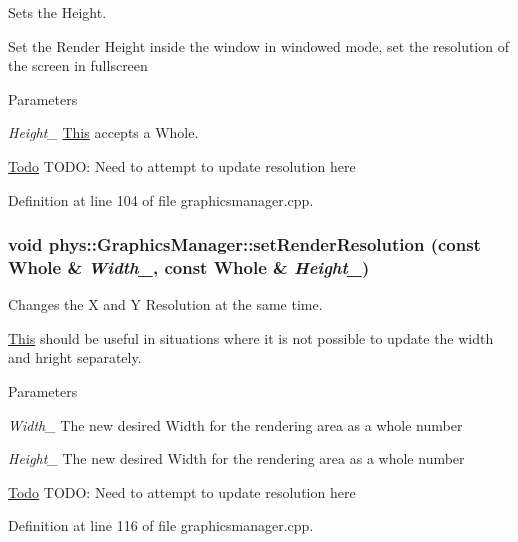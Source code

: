 Sets the Height. 

Set the Render Height inside the window in windowed mode, set the resolution of the screen in fullscreen 
\begin{DoxyParams}{Parameters}
\item[{\em Height\_\-}]\hyperlink{structThis}{This} accepts a Whole. \end{DoxyParams}


\begin{Desc}
\item[\hyperlink{todo__todo000011}{Todo}]TODO: Need to attempt to update resolution here \end{Desc}




Definition at line 104 of file graphicsmanager.cpp.

\hypertarget{classphys_1_1GraphicsManager_ac6feb044d9ab394f3e65d51026a899a6}{
\subsubsection[{setRenderResolution}]{\setlength{\rightskip}{0pt plus 5cm}void phys::GraphicsManager::setRenderResolution (const {\bf Whole} \& {\em Width\_\-}, \/  const {\bf Whole} \& {\em Height\_\-})}}
\label{dd/d63/classphys_1_1GraphicsManager_ac6feb044d9ab394f3e65d51026a899a6}


Changes the X and Y Resolution at the same time. 

\hyperlink{structThis}{This} should be useful in situations where it is not possible to update the width and hright separately. 
\begin{DoxyParams}{Parameters}
\item[{\em Width\_\-}]The new desired Width for the rendering area as a whole number \item[{\em Height\_\-}]The new desired Width for the rendering area as a whole number \end{DoxyParams}


\begin{Desc}
\item[\hyperlink{todo__todo000013}{Todo}]TODO: Need to attempt to update resolution here \end{Desc}




Definition at line 116 of file graphicsmanager.cpp.

